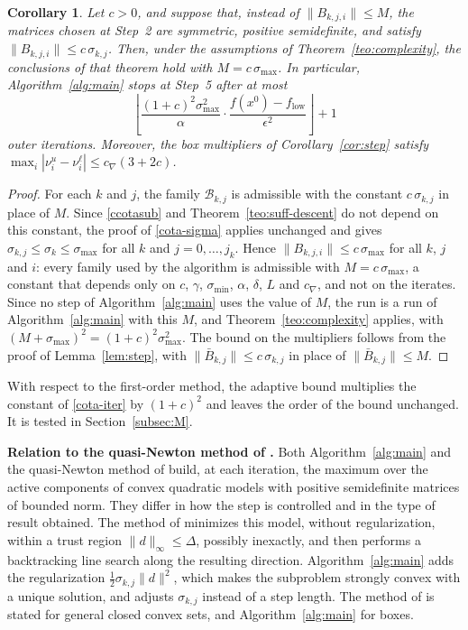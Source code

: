 \documentclass[11pt]{article}
\newcommand{\flow}{f_{\mathrm{low}}}
\newtheorem{corollary}[theorem]{Corollary}
\newcounter{alg}[section]
\begin{document}
\begin{corollary} \label{cor:adaptive}
Let $c > 0$, and suppose that, instead of $\|B_{k,j,i}\| \leq M$, the matrices
chosen at Step~2 are symmetric, positive semidefinite, and satisfy
$\|B_{k,j,i}\| \leq c\,\sigma_{k,j}$. Then, under the assumptions of
Theorem~\ref{teo:complexity}, the conclusions of that theorem hold with
$M = c\,\sigma_{\max}$. In particular, Algorithm~\ref{alg:main} stops at
Step~5 after at most
\[
\left\lfloor \frac{(1 + c)^2 \sigma_{\max}^2}{\alpha}
\cdot \frac{f(x^0) - \flow}{\epsilon^2} \right\rfloor + 1
\]
outer iterations. Moreover, the box multipliers of Corollary~\ref{cor:step}
satisfy $\max_{i} |\nu^u_i - \nu^\ell_i| \leq c_\nabla(3 + 2c)$.
\end{corollary}

\begin{proof}
For each $k$ and $j$, the family $\mathcal{B}_{k,j}$ is admissible with the
constant $c\,\sigma_{k,j}$ in place of $M$. Since \eqref{ccotasub} and
Theorem~\ref{teo:suff-descent} do not depend on this constant, the proof of
\eqref{cota-sigma} applies unchanged and gives
$\sigma_{k,j} \leq \sigma_k \leq \sigma_{\max}$ for all $k$ and
$j = 0, \ldots, j_k$. Hence $\|B_{k,j,i}\| \leq c\,\sigma_{\max}$ for all $k$,
$j$ and $i$: every family used by the algorithm is admissible with
$M = c\,\sigma_{\max}$, a constant that depends only on $c$, $\gamma$,
$\sigma_{\min}$, $\alpha$, $\delta$, $L$ and $c_\nabla$, and not on the
iterates. Since no step of Algorithm~\ref{alg:main} uses the value of $M$, the
run is a run of Algorithm~\ref{alg:main} with this $M$, and
Theorem~\ref{teo:complexity} applies, with
$(M + \sigma_{\max})^2 = (1 + c)^2\sigma_{\max}^2$. The bound on the
multipliers follows from the proof of Lemma~\ref{lem:step}, with
$\|\bar{B}_{k,j}\| \leq c\,\sigma_{k,j}$ in place of
$\|\bar{B}_{k,j}\| \leq M$.
\end{proof}

With respect to the first-order method, the adaptive bound multiplies the
constant of \eqref{cota-iter} by $(1 + c)^2$ and leaves the order of the bound
unchanged. It is tested in Section~\ref{subsec:M}.

\medskip
\noindent\textbf{Relation to the quasi-Newton method of \cite{yano1}.}
Both Algorithm~\ref{alg:main} and the quasi-Newton method of \cite{yano1}
build, at each iteration, the maximum over the active components of convex
quadratic models with positive semidefinite matrices of bounded norm. They
differ in how the step is controlled and in the type of result obtained. The
method of \cite{yano1} minimizes this model, without regularization, within a
trust region $\|d\|_\infty \le \Delta$, possibly inexactly, and then performs a
backtracking line search along the resulting direction. Algorithm~\ref{alg:main}
adds the regularization $\tfrac{1}{2}\sigma_{k,j}\|d\|^2$, which makes the
subproblem strongly convex with a unique solution, and adjusts $\sigma_{k,j}$
instead of a step length. The method of \cite{yano1} is stated for general
closed convex sets, and Algorithm~\ref{alg:main} for boxes.
\end{document}
